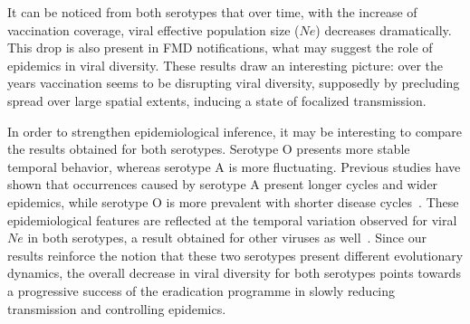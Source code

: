 \documentclass[10pt]{article}
\begin{document}



It can be noticed from both serotypes that over time, with the increase of vaccination coverage, viral effective population size ($Ne$) decreases dramatically.
This drop is also present in FMD notifications, what may suggest the role of epidemics in viral diversity.
These results draw an interesting picture: over the years vaccination seems to be disrupting viral diversity, supposedly by precluding spread over large spatial extents, inducing a state of focalized transmission.

In order to strengthen epidemiological inference, it may be interesting to compare the results obtained for both serotypes.
Serotype O presents more stable temporal behavior, whereas serotype A is more fluctuating.
Previous studies have shown that occurrences caused by serotype A present longer cycles and wider epidemics, while serotype O is more prevalent with shorter disease cycles~\cite{colombiatime}.
These epidemiological features are reflected at the temporal variation observed for viral $Ne$ in both serotypes, a result obtained for other viruses as well~\cite{Bennett2010,Pybus2003}. 
Since our results reinforce the notion that these two serotypes present different evolutionary dynamics, the overall decrease in viral diversity for both serotypes points towards a progressive success of the eradication programme in slowly reducing transmission and controlling epidemics.
\end{document}
